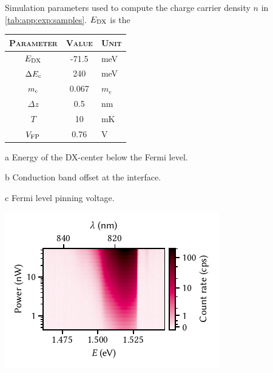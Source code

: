 \begin{margintable}
    \centering
    \footnotesize
    \begin{threeparttable}
        \caption{
            Simulation parameters used to compute the charge carrier density $n$ in \cref{tab:app:exp:samples}.
            $E_{\mathrm{DX}}$ is the
        }
        \label{tab:app:exp:samples:ps}
        \begin{tabularx}{\marginparwidth}{c S l}
            \toprule
            \textsc{Parameter}              & {\textsc{Value}}  & \textsc{Unit} \\
            \midrule
            $E_{\mathrm{DX}}$          & -71.5             & \unit{meV} \\
            $\Delta E_{\mathrm{c}}$    & 240               & \unit{meV} \\
            $m_{\mathrm{c}}$                    & 0.067             & $m_e$ \\
            $\Delta z$                      & 0.5               & \unit{nm} \\
            $T$                             & 10                & \unit{mK} \\
            $V_{\mathrm{FP}}$          & 0.76              & \unit{V} \\
            \bottomrule
        \end{tabularx}
        \begin{tablenotes}
            \scriptsize
            \item[a] Energy of the DX-center below the Fermi level.
            \item[b] Conduction band offset at the  interface.
            \item[c] Fermi level pinning voltage.
        \end{tablenotes}
    \end{threeparttable}
\end{margintable}
%

\begin{marginfigure}
    \centering
    \includegraphics{img/pdf/experiment/2deg_pl_power_dependence}
    \caption[
        \protect\newline
    ]{}
    \label{fig:app:exp:observations:2deg_pl_power_dependence}
\end{marginfigure}

